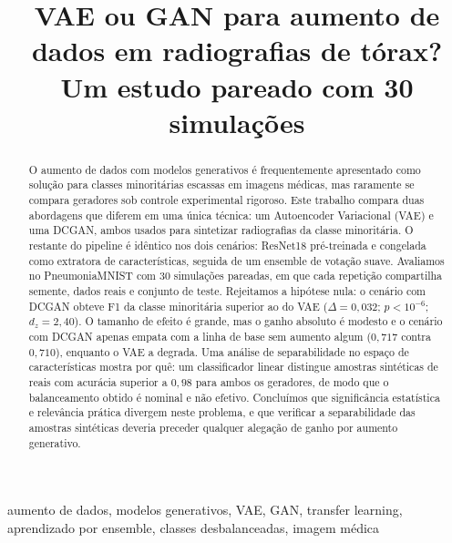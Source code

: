 \documentclass[conference]{IEEEtran}
\begin{document}
\title{VAE ou GAN para aumento de dados em radiografias de tórax?\\
Um estudo pareado com 30 simulações}

\author{
\and
{}
}

\maketitle

\begin{abstract}
O aumento de dados com modelos generativos é frequentemente apresentado como
solução para classes minoritárias escassas em imagens médicas, mas raramente
se compara geradores sob controle experimental rigoroso. Este trabalho compara
duas abordagens que diferem em uma única técnica: um Autoencoder Variacional
(VAE) e uma DCGAN, ambos usados para sintetizar radiografias da classe
minoritária. O restante do pipeline é idêntico nos dois cenários: ResNet18
pré-treinada e congelada como extratora de características, seguida de um
ensemble de votação suave. Avaliamos no PneumoniaMNIST com 30 simulações
pareadas, em que cada repetição compartilha semente, dados reais e conjunto de
teste. Rejeitamos a hipótese nula: o cenário com DCGAN obteve F1 da classe
minoritária superior ao do VAE ($\Delta = 0{,}032$; $p < 10^{-6}$;
$d_z = 2{,}40$). O tamanho de efeito é grande, mas o ganho absoluto é modesto e
o cenário com DCGAN apenas empata com a linha de base sem aumento algum
($0{,}717$ contra $0{,}710$), enquanto o VAE a degrada. Uma análise de
separabilidade no espaço de características mostra por quê: um classificador
linear distingue amostras sintéticas de reais com acurácia superior a
$0{,}98$ para ambos os geradores, de modo que o balanceamento obtido é nominal
e não efetivo. Concluímos que significância estatística e relevância prática
divergem neste problema, e que verificar a separabilidade das amostras
sintéticas deveria preceder qualquer alegação de ganho por aumento generativo.
\end{abstract}

\begin{IEEEkeywords}
aumento de dados, modelos generativos, VAE, GAN, transfer learning,
aprendizado por ensemble, classes desbalanceadas, imagem médica
\end{IEEEkeywords}
\end{document}
